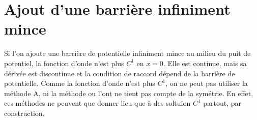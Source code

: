\documentclass[11pt,a4paper,oneside]{article}
\begin{document}
\section{Ajout d'une barrière infiniment mince}

    Si l'on ajoute une barrière de potentielle infiniment mince au milieu du puit de potentiel, la fonction d'onde n'est plus $C^1$ en $x=0$. Elle est continue, mais sa dérivée est discontinue et la condition de raccord dépend de la barrière de potentielle. Comme la fonction d'onde n'est plus $C^1$, on ne peut pas utiliser la méthode A, ni la méthode ou l'ont ne tient pas compte de la symétrie. En effet, ces méthodes ne peuvent que donner lieu que à des soltuion $C^1$ partout, par construction.

\end{document}
